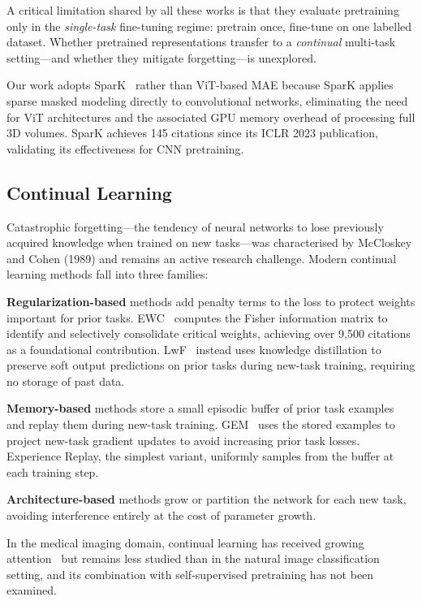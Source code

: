 \documentclass[conference]{IEEEtran}
\begin{document}
A critical limitation shared by all these works is that they evaluate pretraining only in the \emph{single-task} fine-tuning regime: pretrain once, fine-tune on one labelled dataset. Whether pretrained representations transfer to a \emph{continual} multi-task setting—and whether they mitigate forgetting—is unexplored.

Our work adopts SparK~\cite{tian2023spark} rather than ViT-based MAE because SparK applies sparse masked modeling directly to convolutional networks, eliminating the need for ViT architectures and the associated GPU memory overhead of processing full 3D volumes. SparK achieves 145 citations since its ICLR 2023 publication, validating its effectiveness for CNN pretraining.

\subsection{Continual Learning}

Catastrophic forgetting—the tendency of neural networks to lose previously acquired knowledge when trained on new tasks—was characterised by McCloskey and Cohen (1989) and remains an active research challenge. Modern continual learning methods fall into three families:

\textbf{Regularization-based} methods add penalty terms to the loss to protect weights important for prior tasks. EWC~\cite{kirkpatrick2017ewc} computes the Fisher information matrix to identify and selectively consolidate critical weights, achieving over 9{,}500 citations as a foundational contribution. LwF~\cite{li2016lwf} instead uses knowledge distillation to preserve soft output predictions on prior tasks during new-task training, requiring no storage of past data.

\textbf{Memory-based} methods store a small episodic buffer of prior task examples and replay them during new-task training. GEM~\cite{lopezpaz2017gem} uses the stored examples to project new-task gradient updates to avoid increasing prior task losses. Experience Replay, the simplest variant, uniformly samples from the buffer at each training step.

\textbf{Architecture-based} methods grow or partition the network for each new task, avoiding interference entirely at the cost of parameter growth.

In the medical imaging domain, continual learning has received growing attention~\cite{kim2025mosinversion,yang2025continual} but remains less studied than in the natural image classification setting, and its combination with self-supervised pretraining has not been examined.
\end{document}
